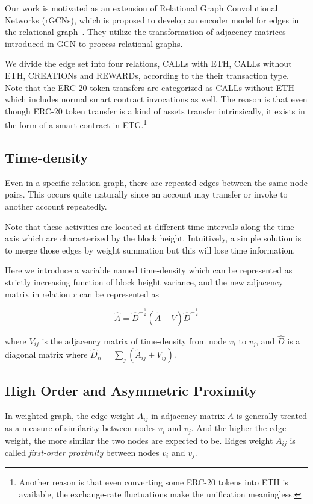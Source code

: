 Our work is motivated as an extension of Relational Graph Convolutional Networks (rGCNs), which is proposed to develop an encoder model for edges in the relational graph~\cite{schlichtkrull2018modeling}. They utilize the transformation of adjacency matrices introduced in GCN to process relational graphs. 

We divide the edge set into four relations, CALLs with ETH, CALLs without ETH, CREATIONs and REWARDs, according to the their transaction type. Note that the ERC-20 token transfers are categorized as CALLs without ETH which includes normal smart contract invocations as well. The reason is that even though ERC-20 token transfer is a kind of assets transfer intrinsically, it exists in the form of a smart contract in ETG.\footnote{Another reason is that even converting some ERC-20 tokens into ETH is available, the exchange-rate fluctuations make the unification meaningless.} %


\subsection{Time-density}
\label{section:time}
Even in a specific relation graph, there are repeated edges between the same node pairs. This occurs quite naturally since an account may transfer or invoke to another account repeatedly.

Note that these activities are located at different time intervals along the time axis which are characterized by the block height. Intuitively, a simple solution is to merge those edges by weight summation but this will lose time information. 

Here we introduce a variable named time-density which can be represented as strictly increasing function of block height variance, and the new adjacency matrix in relation $r$ can be represented as 

\begin{equation}
\hat{A}=\hat{D}^{-\frac{1}{2}}(\tilde{A}+V)\hat{D}^{-\frac{1}{2}}
\label{eq:?}
\end{equation}

where $V_{ij}$ is the adjacency matrix of time-density from node $v_i$ to $v_j$, and $\hat{D}$ is a diagonal matrix where $\hat{D}_{ii}=\sum_{j}(\tilde{A}_{ij}+V_{ij})$.

\subsection{High Order and Asymmetric Proximity}
In weighted graph, the edge weight $A_{ij}$ in adjacency matrix $A$ is generally treated as a measure of similarity between nodes $v_i$ and $v_j$. And the higher the edge weight, the more similar the two nodes are expected to be. Edges weight $A_{ij}$ is called \emph{first-order proximity} between nodes $v_i$ and $v_j$. 

